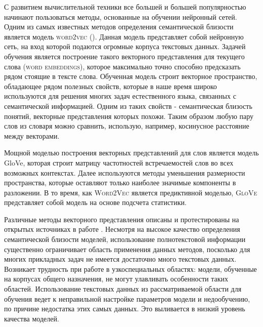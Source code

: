 С развитием вычислительной техники все большей и большей популярностью начинают пользоваться методы, основанные на обучении нейронный сетей. Одним из самых известных методов определения семантической близости является модель \textsc{word2vec} (\cite{word2vec}). Данная модель представляет собой нейронную сеть, на вход которой подаются огромные корпуса текстовых данных. Задачей обучения является построение такого векторного представления для текущего слова (\textsc{word embeddings}), которое максимально точно способно предсказать рядом стоящие в тексте слова. Обученная модель строит векторное пространство, обладающее рядом полезных свойств, которые в наше время широко используются для решения многих задач естественного языка, связанных с семантической информацией. Одним из таких свойств - семантическая близость понятий, векторные представления которых похожи. Таким образом любую пару слов из словаря можно сравнить, использую, например, косинусное расстояние между векторами.

Мощной моделью построения векторных представлений для слов является модель GloVe, которая строит матрицу частотностей встречаемостей слов во всех возможных контекстах. Далее используются методы уменьшения размерности пространства, которые оставляют только наиболее значимые компоненты в разложении. В то время, как \textsc{Word2Vec} является предиктивной моделью, \textsc{GloVe} представляет собой модель на основе подсчета статистики.

Различные методы векторного представления описаны и протестированы на открытых источниках в работе \cite{embed_1}. Несмотря на высокое качество определения семантической близости моделей, использование полнотекстовой информации существенно ограничивает область применения данных методов, посколько для многих прикладных задач не имеется достаточно много текстовых данных. Возникает трудность при работе в узкоспециальных областях: модели, обученные на корпусах общего назначения, не могут улавливать особенности таких областей. Использование текстовых данных из рассматриваемой области для обучения ведет к неправильной настройке параметров модели и недообучению, по причине недостатка этих самых данных. Это выливается в низкий уровень качества моделей. 

